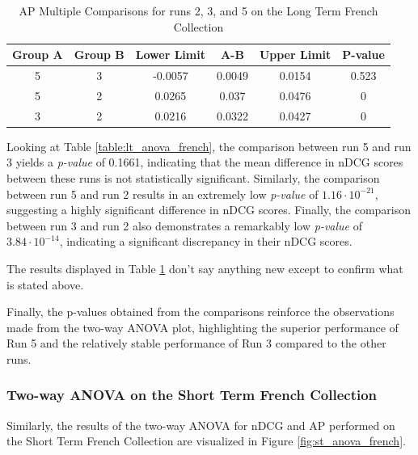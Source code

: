 \begin{table}[!h]
    \centering
    \caption{\ac{AP} Multiple Comparisons for runs 2, 3, and 5 on the Long Term French Collection}
    \label{table:lt_anova_french_ap}
    \begin{tabular}{cccccc}
    \hline
    Group A & Group B & Lower Limit & A-B & Upper Limit & P-value \\ \hline
    5 & 3 & -0.0057 & 0.0049 & 0.0154 & 0.523 \\
    5 & 2 & 0.0265 & 0.037 & 0.0476 & 0 \\
    3 & 2 & 0.0216 & 0.0322 & 0.0427 & 0 \\ \hline
    \end{tabular}
\end{table}

Looking at Table \ref{table:lt_anova_french}, the comparison between run 5 and run 3 yields a \textit{p-value} of 0.1661, indicating that the mean difference in \ac{nDCG} scores between these runs is not statistically significant. 
Similarly, the comparison between run 5 and run 2 results in an extremely low \textit{p-value} of $1.16 \cdot 10^{-21}$, suggesting a highly significant difference in \ac{nDCG} scores. 
Finally, the comparison between run 3 and run 2 also demonstrates a remarkably low \textit{p-value} of $3.84 \cdot 10^{-14}$, indicating a significant discrepancy in their \ac{nDCG} scores.

The results displayed in Table \ref{table:lt_anova_french_ap} don't say anything new except to confirm what is stated above.

Finally, the p-values obtained from the comparisons reinforce the observations made from the two-way \ac{ANOVA} plot, highlighting the superior performance of Run 5 and the relatively stable performance of Run 3 compared to the other runs.

\newpage
\enlargethispage{10\baselineskip}
\subsubsection{Two-way ANOVA on the Short Term French Collection}

Similarly, the results of the two-way \ac{ANOVA} for \ac{nDCG} and \ac{AP} performed on the Short Term French Collection are visualized in Figure \ref{fig:st_anova_french}. 

